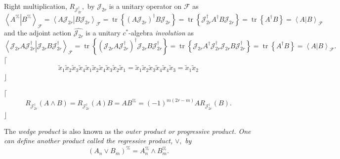 \documentclass[aps,preprint]{revtex4}%
\begin{document}
Right multiplication, $R_{\mathcal{J}_{2r}^{\dagger}},$ by $\mathcal{J}_{2r}$
is a unitary operator on $\mathcal{F}$ as
\begin{equation}
\left\langle \left.  A^{\%}\right\vert B^{\%}\right\rangle _{\mathcal{F}%
}=\left\langle \left.  A\mathcal{J}_{2r}\right\vert B\mathcal{J}%
_{2r}\right\rangle _{\mathcal{F}}=\operatorname*{tr}\left\{  \left(
A\mathcal{J}_{2r}\right)  ^{\dagger}B\mathcal{J}_{2r}\right\}
=\operatorname*{tr}\left\{  \mathcal{J}_{2r}^{\dagger}A^{\dagger}%
B\mathcal{J}_{2r}\right\}  =\operatorname*{tr}\left\{  A^{\dagger}B\right\}
=\left\langle \left.  A\right\vert B\right\rangle _{\mathcal{F}}%
\end{equation}
and the adjoint action $\widehat{\mathcal{J}_{2r}}$ is a unitary $c^{\ast}%
$-algebra \emph{involution} as
\begin{equation}
\left\langle \left.  \mathcal{J}_{2r}A\mathcal{J}_{2r}^{\dagger}\right\vert
\mathcal{J}_{2r}B\mathcal{J}_{2r}^{\dagger}\right\rangle _{\mathcal{F}%
}=\operatorname*{tr}\left\{  \left(  \mathcal{J}_{2r}A\mathcal{J}%
_{2r}^{\dagger}\right)  ^{\dagger}\mathcal{J}_{2r}B\mathcal{J}_{2r}^{\dagger
}\right\}  =\operatorname*{tr}\left\{  \mathcal{J}_{2r}A^{\dagger}%
\mathcal{J}_{2r}^{\dagger}\mathcal{J}_{2r}B\mathcal{J}_{2r}^{\dagger}\right\}
=\operatorname*{tr}\left\{  A^{\dagger}B\right\}  =\left\langle \left.
A\right\vert B\right\rangle _{\mathcal{F}}.
\end{equation}
$\lceil$%
\begin{equation}
\widetilde{x}_{1}\widetilde{x}_{2}\widetilde{x}_{3}\widetilde{x}%
_{4}\widetilde{x}_{1}\widetilde{x}_{2}\widetilde{x}_{4}\widetilde{x}%
_{3}\widetilde{x}_{2}\widetilde{x}_{1}=\widetilde{x}_{1}\widetilde{x}%
_{2}\widetilde{x}_{3}\widetilde{x}_{4}\widetilde{x}_{4}\widetilde{x}%
_{3}=\widetilde{x}_{1}\widetilde{x}_{2}%
\end{equation}
$\rfloor$

$\lceil$%
\begin{equation}
R_{\mathcal{J}_{2r}^{\dagger}}(A\wedge B)=R_{\mathcal{J}_{2r}^{\dagger}%
}\left(  A\right)  B=AB^{\%}=\left(  -1\right)  ^{m\left(  2r-m\right)
}AR_{\mathcal{J}_{2r}^{\dagger}}\left(  B\right)  .
\end{equation}
$\rfloor$

The \emph{wedge product} is also known as the \emph{outer product or
progressive product. One can define another product called the regressive
product, }$\vee,$\emph{ by }%
\begin{equation}
\left(  A_{n}\vee B_{m}\right)  ^{\%}=A_{n}^{\%}\wedge B_{m}^{\%}.
\end{equation}
\end{document}
